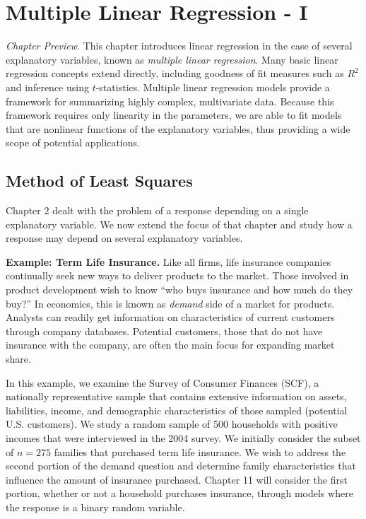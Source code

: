  \setcounter{chapter}{2}
\chapter{Multiple Linear Regression - I}

{\small \textit{Chapter Preview}. This chapter introduces linear
regression in the case of several explanatory variables, known as
\emph{multiple linear regression}. Many basic linear regression
concepts extend directly, including goodness of fit measures such as
$R^2$ and inference using $t$-statistics. Multiple linear regression
models provide a framework for summarizing highly complex,
multivariate data. Because this framework requires only linearity in
the parameters, we are able to fit models that are nonlinear
functions of the explanatory variables, thus providing a wide scope
of potential applications.}

\section{Method of Least Squares}\label{S3:LSMethod}

Chapter 2 dealt with the problem of a response depending on a single
explanatory variable. We now extend the focus of that chapter and study how
a response may depend on several explanatory variables.

\linejed


\textbf{Example: Term Life Insurance.} Like all firms, life insurance companies continually
seek new ways to deliver products to the market. Those involved in
product development wish to know ``who buys insurance and how much
do they buy?'' In economics, this is known as \emph{demand} side of
a market for products. Analysts can readily get information on
characteristics of current customers through company databases.
Potential customers, those that do not have insurance with the
company, are often the main focus for expanding market share.

In this example, we examine the Survey of Consumer Finances (SCF), a
nationally representative sample that contains extensive information
on assets, liabilities, income, and demographic characteristics of
those sampled (potential U.S. customers). We study a random sample
of 500 households with positive incomes that were interviewed in the
2004 survey. We initially consider the subset of $n=275$ families
that purchased term life insurance. We wish to address the second
portion of the demand question and determine family characteristics
that influence the amount of insurance purchased. Chapter 11 will
consider the first portion, whether or not a household purchases
insurance, through models where the response is a binary random
variable.

